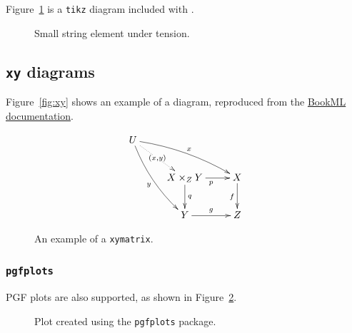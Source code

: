 Figure~\ref{fig:string} is a \texttt{tikz} diagram included with \verb||.

\begin{figure}[H]
    \centering
    
    \caption{Small string element under tension.}
    \label{fig:string}
\end{figure}


\subsection{\texttt{xy} diagrams}
\label{demo:fig:xy}


Figure~\ref{fig:xy} shows an example of a diagram, reproduced from the \href{https://vlmantova.github.io/bookml/#S4.F4}{BookML documentation}.


\begin{figure}
    \begin{bmlimage}
    $$
      \xymatrix{
        U \ar@/_/[ddr]_y \ar@/^/[drr]^x \ar@{.>}[dr]|-{(x,y)} \\
        & X \times_Z Y \ar[d]^q \ar[r]_p & X \ar[d]_f \\
        & Y \ar[r]^g & Z}
    $$
    \end{bmlimage}
    \caption{An example of a \texttt{xymatrix}.}
\end{figure}


\subsubsection{\texttt{pgfplots}}
\label{demo:fig:pgf}

PGF plots are also supported, as shown in Figure~\ref{fig:sqrt}.

\begin{figure}[H]
    \centering
    \caption{Plot created using the \texttt{pgfplots} package.}
    \label{fig:sqrt}
\end{figure}

